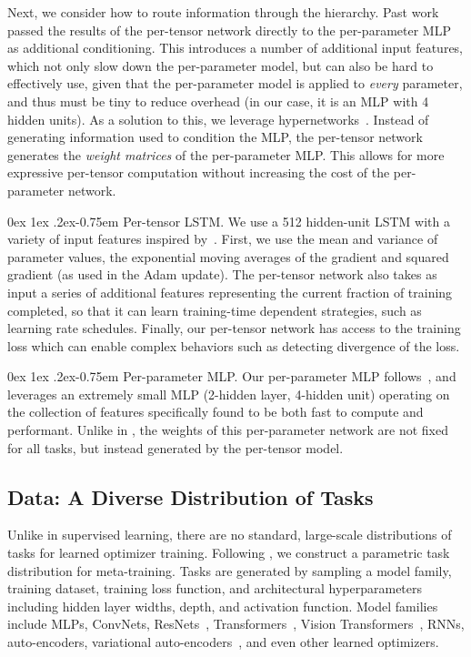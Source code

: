 \documentclass[11pt]{article}
\makeatletter
\renewcommand{\paragraph}{%
  \@startsection{paragraph}{4}%
  {\z@}{0ex \@plus 1ex \@minus .2ex}{-0.75em}%
  {\normalfont\normalsize\bfseries}%
}
\makeatother
\begin{document}
Next, we consider how to route information through the hierarchy.
Past work~\citep{wichrowska2017learned, metz2020tasks} passed the results of the per-tensor network directly to the per-parameter MLP as additional conditioning.
This introduces a number of additional input features, which not only slow down the per-parameter model, but can also be hard to effectively use, given that the per-parameter model is applied to \textit{every} parameter, and thus must be tiny to reduce overhead (in our case, it is an MLP with 4 hidden units).
As a solution to this, we leverage hypernetworks~\citep{ha2016hypernetworks}. 
Instead of generating information used to condition the MLP, the per-tensor network generates the \textit{weight matrices} of the per-parameter MLP.
This allows for more expressive per-tensor computation without increasing the cost of the per-parameter network.

\paragraph{Per-tensor LSTM.} We use a 512 hidden-unit LSTM with a variety of input features inspired by~\citet{metz2020tasks}.
First, we use the mean and variance of parameter values, the exponential moving averages of the gradient and squared gradient (as used in the Adam update).
The per-tensor network also takes as input a series of additional features representing the current fraction of training completed, so that it can learn training-time dependent strategies, 
such as learning rate schedules.
Finally, our per-tensor network has access to the training loss which can enable complex behaviors such as detecting divergence of the loss.

\paragraph{Per-parameter MLP.}
Our per-parameter MLP follows~\citet{metz2022practical}, and leverages an extremely small MLP (2-hidden layer, 4-hidden unit) operating on the collection of features specifically found to be both fast to compute and performant. 
Unlike in \citet{metz2022practical}, the weights of this per-parameter network are not fixed for all tasks, but instead generated by the per-tensor model. 

\subsection{Data: A Diverse Distribution of Tasks} \label{sec:data}
Unlike in supervised learning, there are no standard, large-scale distributions of tasks for learned optimizer training.
Following \citet{metz2020tasks}, we construct a parametric task distribution for meta-training.
Tasks are generated by sampling a model family, training dataset, training loss function, and architectural hyperparameters including hidden layer widths, depth, and activation function.
Model families include MLPs, ConvNets, ResNets~\citep{he2015delving}, Transformers~\citep{vaswani2017attention}, Vision Transformers~\citep{dosovitskiy2020image}, RNNs, auto-encoders, variational auto-encoders~\citep{kingma2013auto}, and even other learned optimizers.
\end{document}
